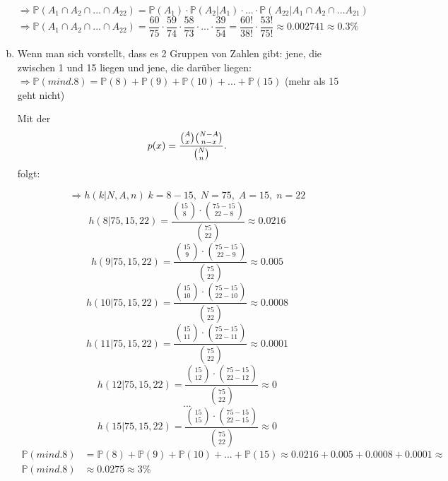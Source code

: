 \begin{uebsp}
\begin{Answer}
\begin{enumerate}[(a)]
        \[\Rightarrow \mathbb{P}(A_1\cap A_2\cap ...\cap A_{22})=\mathbb{P}(A_1)\cdot\mathbb{P}(A_2|A_1)\cdot ...\cdot \mathbb{P}(A_{22}|A_1\cap A_2\cap ... A_{21})\]
        \[\Rightarrow \mathbb{P}(A_1\cap A_2\cap ...\cap A_{22})=\frac{60}{75}\cdot \frac{59}{74}\cdot \frac{58}{73}\cdot ...\cdot \frac{39}{54}=\dfrac{60!}{38!}\cdot\frac{53!}{75!}\approx 0.002741\approx 0.3\%\]

        \item Wenn man sich vorstellt, dass es 2 Gruppen von Zahlen gibt: jene, die zwischen 1 und 15 liegen und jene, die darüber liegen: $\Rightarrow \mathbb{P}(mind. 8)=\mathbb{P}(8)+\mathbb{P}(9)+\mathbb{P}(10)+...+\mathbb{P}(15)$ (mehr als 15 geht nicht)\\

        \begin{uebsp_theory}
            Mit der  
            \[p(x)={{A\choose x}{N-A\choose n-x}\over {N\choose n}}.\]
            folgt:
        \end{uebsp_theory}
            \[\Rightarrow h(k|N,A,n)\;k=8-15,\;N=75,\;A=15,\;n=22\]
            \[h(8|75,15,22)=\frac{\binom{15}{8}\cdot \binom{75-15}{22-8}}{\binom{75}{22}}\approx 0.0216\]
            \[h(9|75,15,22)=\frac{\binom{15}{9}\cdot \binom{75-15}{22-9}}{\binom{75}{22}}\approx 0.005\]
            \[h(10|75,15,22)=\frac{\binom{15}{10}\cdot \binom{75-15}{22-10}}{\binom{75}{22}}\approx 0.0008\]
            \[h(11|75,15,22)=\frac{\binom{15}{11}\cdot \binom{75-15}{22-11}}{\binom{75}{22}}\approx 0.0001\]
            \[h(12|75,15,22)=\frac{\binom{15}{12}\cdot \binom{75-15}{22-12}}{\binom{75}{22}}\approx 0\]
            \[...\]
            \[h(15|75,15,22)=\frac{\binom{15}{15}\cdot \binom{75-15}{22-15}}{\binom{75}{22}}\approx 0\]
            \begin{align*}
                \mathbb{P}(mind.8)&=\mathbb{P}(8)+\mathbb{P}(9)+\mathbb{P}(10)+...+\mathbb{P}(15)\approx0.0216+0.005+0.0008+0.0001\approx\\
                \mathbb{P}(mind.8)&\approx0.0275\approx3\%
            \end{align*}

\end{enumerate}
\end{Answer}
\end{uebsp}
